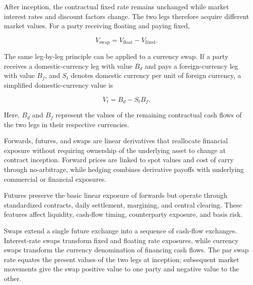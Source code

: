 After inception, the contractual fixed rate remains unchanged while market interest rates and discount factors change. The two legs therefore acquire different market values. For a party receiving floating and paying fixed,

\begin{equation}
V_{\text{swap}}
=
V_{\text{float}}
-
V_{\text{fixed}}.
\label{eq:ch17-swap-value}
\end{equation}

The same leg-by-leg principle can be applied to a currency swap. If a party receives a domestic-currency leg with value $B_d$ and pays a foreign-currency leg with value $B_f$, and $S_t$ denotes domestic currency per unit of foreign currency, a simplified domestic-currency value is

\begin{equation}
V_t
=
B_d-S_tB_f.
\label{eq:ch17-currency-swap-value}
\end{equation}

Here, $B_d$ and $B_f$ represent the values of the remaining contractual cash flows of the two legs in their respective currencies.



Forwards, futures, and swaps are linear derivatives that reallocate financial exposure without requiring ownership of the underlying asset to change at contract inception. Forward prices are linked to spot values and cost of carry through no-arbitrage, while hedging combines derivative payoffs with underlying commercial or financial exposures.

Futures preserve the basic linear exposure of forwards but operate through standardized contracts, daily settlement, margining, and central clearing. These features affect liquidity, cash-flow timing, counterparty exposure, and basis risk.

Swaps extend a single future exchange into a sequence of cash-flow exchanges. Interest-rate swaps transform fixed and floating rate exposures, while currency swaps transform the currency denomination of financing cash flows. The par swap rate equates the present values of the two legs at inception; subsequent market movements give the swap positive value to one party and negative value to the other.


